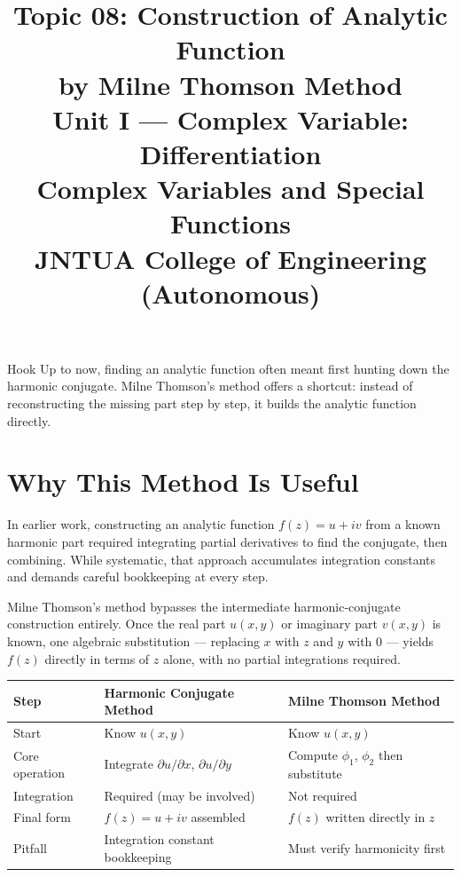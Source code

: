 \documentclass[12pt,a4paper]{article}
\title{\textbf{Topic 08: Construction of Analytic Function\\by Milne Thomson Method}\\[6pt]
\large Unit I --- Complex Variable: Differentiation\\
Complex Variables and Special Functions\\
JNTUA College of Engineering (Autonomous)}
\author{}
\date{}
\begin{document}
\maketitle
\tableofcontents
\newpage

\begin{curiositybox}{Hook}
Up to now, finding an analytic function often meant first hunting down the harmonic conjugate. Milne Thomson's method offers a shortcut: instead of reconstructing the missing part step by step, it builds the analytic function directly.
\end{curiositybox}

\vspace{0.4cm}

\section{Why This Method Is Useful}

In earlier work, constructing an analytic function \( f(z) = u + iv \) from a known harmonic part required integrating partial derivatives to find the conjugate, then combining. While systematic, that approach accumulates integration constants and demands careful bookkeeping at every step.

Milne Thomson's method bypasses the intermediate harmonic-conjugate construction entirely. Once the real part \( u(x,y) \) or imaginary part \( v(x,y) \) is known, one algebraic substitution --- replacing \( x \) with \( z \) and \( y \) with \( 0 \) --- yields \( f(z) \) directly in terms of \( z \) alone, with no partial integrations required.

\begin{center}
\begin{tabular}{@{}lll@{}}
\toprule
\textbf{Step} & \textbf{Harmonic Conjugate Method} & \textbf{Milne Thomson Method} \\
\midrule
Start & Know \( u(x,y) \) & Know \( u(x,y) \) \\
Core operation & Integrate \( \partial u/\partial x \), \( \partial u/\partial y \) & Compute \( \phi_1 \), \( \phi_2 \) then substitute \\
Integration & Required (may be involved) & Not required \\
Final form & \( f(z) = u + iv \) assembled & \( f(z) \) written directly in \( z \) \\
Pitfall & Integration constant bookkeeping & Must verify harmonicity first \\
\bottomrule
\end{tabular}
\end{center}
\end{document}
